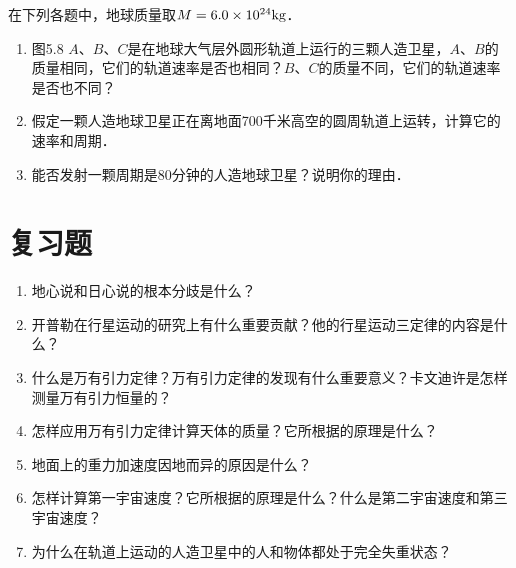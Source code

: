 在下列各题中，地球质量取$M=6.0\times 10^{24}{\rm kg}$．
\begin{enumerate}
	\item 图5.8 $A$、$B$、$C$是在地球大气层外圆形轨道上运行的三颗人造卫星，$A$、$B$的质量相同，它们的轨道速率是否也相同？$B$、$C$的质量不同，它们的轨道速率是否也不同？

\begin{figure}[htp]
\centering{}
\caption{}
\end{figure}

\item  假定一颗人造地球卫星正在离地面700千米高空的圆周轨道上运转，计算它的速率和周期．
\item 能否发射一颗周期是80分钟的人造地球卫星？说明你的理由．
\end{enumerate}
	
\section*{复习题}
\begin{enumerate}
	\item 地心说和日心说的根本分歧是什么？
	\item 开普勒在行星运动的研究上有什么重要贡献？他的行星运动三定律的内容是什么？
	\item 什么是万有引力定律？万有引力定律的发现有什么重要意义？卡文迪许是怎样测量万有引力恒量的？
	\item 怎样应用万有引力定律计算天体的质量？它所根据的原理是什么？
	\item 地面上的重力加速度因地而异的原因是什么？
	\item 怎样计算第一宇宙速度？它所根据的原理是什么？什么是第二宇宙速度和第三宇宙速度？
	\item 为什么在轨道上运动的人造卫星中的人和物体都处于完全失重状态？
\end{enumerate}

